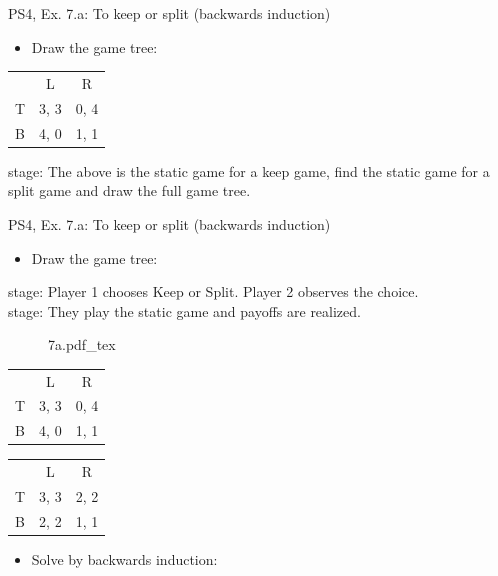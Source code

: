 \begin{frame}{PS4, Ex. 7.a: To keep or split (backwards induction)}
  \begin{multicols}{2}
    \begin{itemize}
      \item[(a)] Draw the game tree:
    \end{itemize}
    \begin{table}
    \begin{tabular}{l|c|c|}
    \multicolumn{1}{c}{} & \multicolumn{1}{c}{L} & \multicolumn{1}{c}{R} \\\cline{2-3}
    T & 3, 3 & 0, 4 \\\cline{2-3}
    B & 4, 0 & 1, 1 \\\cline{2-3}
    \end{tabular}
    \end{table}
     stage: The above is the static game for a keep game, find the static game for a  split game and draw the full game tree.
  \vfill\null \columnbreak
  \vfill\null
  \end{multicols}
\end{frame}
\begin{frame}{PS4, Ex. 7.a: To keep or split (backwards induction)}
  \begin{multicols}{2}
    \begin{itemize}
      \item[(a)] Draw the game tree:
    \end{itemize}
     stage: Player 1 chooses Keep or Split. Player 2 observes the choice.\\\medskip
     stage: They play the static game and payoffs are realized.
    \begin{figure}[!h]
      \center
      \def\svgwidth{.5\columnwidth}
      {7a.pdf_tex}
    \end{figure}
    \vspace{-12pt}
    \begin{table}
      \begin{tabular}{l|c|c|}
        \multicolumn{1}{c}{} & \multicolumn{1}{c}{L} & \multicolumn{1}{c}{R} \\\cline{2-3}
        T & 3, 3 & 0, 4 \\\cline{2-3}
        B & 4, 0 & 1, 1 \\\cline{2-3}
      \end{tabular}
      \enskip
      \begin{tabular}{l|c|c|}
        \multicolumn{1}{c}{} & \multicolumn{1}{c}{L} & \multicolumn{1}{c}{R} \\\cline{2-3}
        T & 3, 3 & 2, 2 \\\cline{2-3}
        B & 2, 2 & 1, 1 \\\cline{2-3}
      \end{tabular}
    \end{table}
  \vfill\null \columnbreak
    \begin{itemize}
    \item[(b)] Solve by backwards induction:
    \end{itemize}
  \vfill\null
  \end{multicols}
\end{frame}

